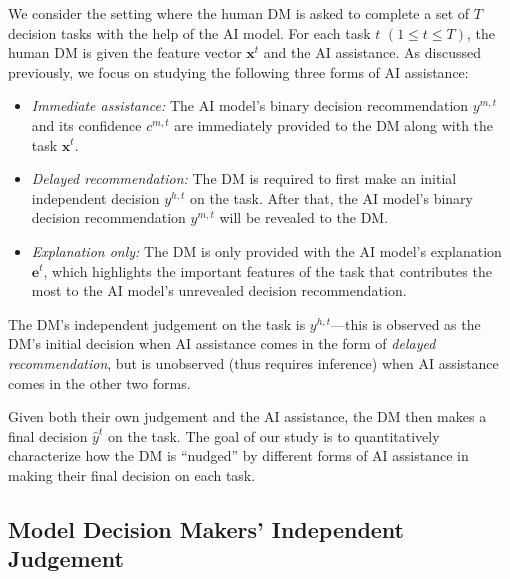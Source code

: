 \documentclass[letterpaper]{article} %
\newcommand{\my}[1]{\textcolor{blue}{[Ming: #1]}}
\newcommand{\zy}[1]{\textcolor{red}{[Zhuoyan: #1]}}
\begin{document}
We consider the setting where the human DM is asked to complete a set of $T$ decision tasks with the help of the AI model. For each task $t$ $(1\leq t \leq T)$, the human DM is given the feature vector $\bm{x}^t$ and the AI assistance. As discussed previously, we focus on studying the following three forms of AI assistance:
\begin{itemize}
\label{ai_treament}
    \item \emph{Immediate assistance:} The AI model's binary decision recommendation $y^{m,t}$ and its confidence $c^{m,t}$ are immediately provided to the DM along with the task $\bm{x}^t$.

    \item \emph{Delayed recommendation:} The DM is required to first make an initial independent decision $y^{h,t}$ on the task. After that,
    the AI model's binary decision recommendation $y^{m,t}$ will be revealed to the DM.

    \item \emph{Explanation only:} The DM is only provided with the AI model's explanation $\bm{e}^t$, which highlights the important features of the task that contributes the most to the AI model's unrevealed decision recommendation.


\end{itemize}
The DM's independent judgement on the task is $y^{h,t}$---this is observed as the DM's initial decision when AI assistance comes in the form of
\emph{delayed recommendation}, but is unobserved (thus requires inference) when AI assistance comes in the other two forms.

Given both their own judgement and the AI assistance, the DM then makes a final decision $\hat{y}^t$ on the task. The goal of our study is to quantitatively characterize
how the DM is ``nudged'' by different forms of AI assistance in making their final decision on each task.

\subsection{Model Decision Makers' Independent Judgement}
\end{document}
